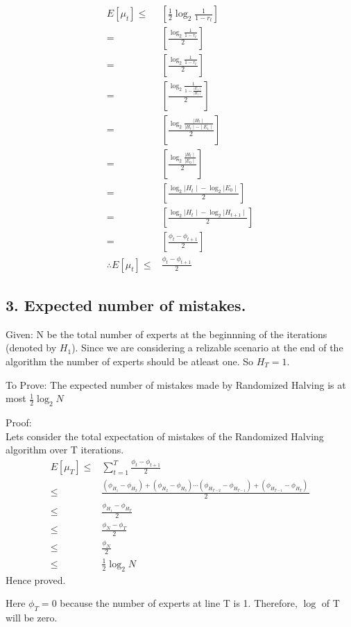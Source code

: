 \documentclass{article}
\begin{document}
\begin{description}
    \begin{align*}
      E[\mu_{t}] \le & [\frac{1}{2} \log_2{\frac{1}{1 - r_{t}}}] \\
      = & [ \frac{\log_2{\frac{1}{1 - r_{t}}}}{2}] \\
      = & [ \frac{\log_2{\frac{1}{1 - r_{t}}}}{2}] \\
      = & [ \frac{\log_2{\frac{1}{1 - \frac{\mid E_{1} \mid}{\mid H_{t} \mid}}}}{2}] \\
      = & [ \frac{\log_2{\frac{\mid H_{t} \mid}{\mid H_{t} \mid - \mid E_{1} \mid}}}{2}] \\
      = & [ \frac{\log_2{\frac{\mid H_{t} \mid}{\mid E_{0} \mid}}}{2}] \\
      = & [ \frac{\log_2{\mid H_{t} \mid} - \log_2{\mid E_{0} \mid}}{2}] \\
      = & [ \frac{\log_2{\mid H_{t} \mid} - \log_2{\mid H_{t+1} \mid}}{2}] \\
      = & [ \frac{\phi_{t} - \phi_{t+1}}{2}] \\
      \therefore E[\mu_{t}] \le &  \frac{\phi_{t} - \phi_{t+1}}{2}
    \end{align*}
\end{description}

\subsection*{3. Expected number of mistakes.}
\begin{description}
  \item{Given:} N be the total number of experts at the beginnning of the iterations (denoted by \( H_{1} \)). Since we are considering a relizable scenario at the end of the algorithm the number of experts should be atleast one.  So \( H_{T} = 1 \). 
  \item{To Prove:} The expected number of mistakes made by Randomized Halving is at most \( \frac{1}{2}\log_2{N} \)
  \item{Proof:} \\
    Lets consider the total expectation of mistakes of the Randomized Halving algorithm over T iterations.
    \begin{align*}
      E[\mu_{T}] \le & \sum_{t=1}^{T} \frac{\phi_{t} - \phi_{t+1}}{2} \\
      \le & \frac{(\phi_{H_{1}} - \phi_{H_{2}}) + (\phi_{H_{2}} - \phi_{H_{3}})  \cdots (\phi_{H_{T-2}} - \phi_{H_{T-1}}) + (\phi_{H_{T-1}} - \phi_{H_{T}}) \ }{2} \\
      \le & \frac{\phi_{H_{1}} - \phi_{H_{T}}}{2} \\
      \le & \frac{\phi_{N} - \phi_{T}}{2} \\
      \le & \frac{\phi_{N}}{2} \\
      \le & \frac{1}{2}\log_2{N}
    \end{align*}
    Hence proved.

    Here \( \phi_{T} = 0 \) because the number of experts at line T is 1.  Therefore, \( \log \) of T will be zero.
\end{description}
\end{document}

